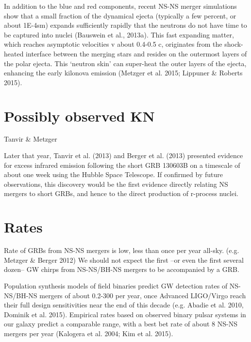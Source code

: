 In addition to the blue and red components, recent NS-NS merger simulations show that a small fraction of the dynamical ejecta (typically a few percent, or about 1E-4sm) expands sufficiently rapidly that the neutrons do not have time to be captured into nuclei (Bauswein et al., 2013a). This fast expanding matter, which reaches asymptotic velocities v about 0.4-0.5 c, originates from the shock- heated interface between the merging stars and resides on the outermost layers of the polar ejecta. This `neutron skin' can super-heat the outer layers of the ejecta, enhancing the early kilonova emission (Metzger et al. 2015; Lippuner \& Roberts 2015).

\section{Possibly observed KN}

Tanvir \& Metzger

Later that year, Tanvir et al. (2013) and Berger et al. (2013) presented evidence for excess infrared emission following the short GRB 130603B on a timescale of about one week using the Hubble Space Telescope. If confirmed by future observations, this discovery would be the first evidence directly relating NS mergers to short GRBs, and hence to the direct production of r-process nuclei.

\section{Rates}

Rate of GRBs from NS-NS mergers is low, less than once per year all-sky. (e.g. Metzger \& Berger 2012)
We should not expect the first --or even the first several dozen-- GW chirps from NS-NS/BH-NS mergers to be accompanied by a GRB.


Population synthesis models of field binaries predict GW detection rates of NS-NS/BH-NS mergers of about 0.2-300 per year, once Advanced LIGO/Virgo reach their full design sensitivities near the end of this decade (e.g. Abadie et al. 2010, Dominik et al. 2015).
Empirical rates based on observed binary pulsar systems in our galaxy predict a comparable range, with a best bet rate of about 8 NS-NS mergers per year (Kalogera et al. 2004; Kim et al. 2015).









